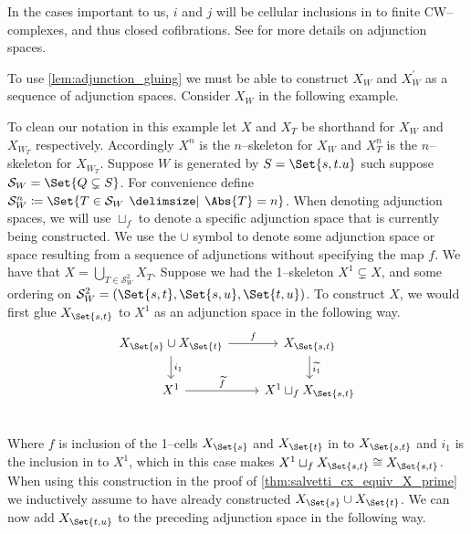 \documentclass[class=article, crop=false]{standalone}
\begin{document}
In the cases important to us, $i$ and $j$ will be cellular inclusions in to finite CW--complexes, and thus closed cofibrations. See \cite{brown_topology_2006} for more details on adjunction spaces.

To use \cref{lem:adjunction_gluing} we must be able to construct $X_W$ and $X_W^\prime$ as a sequence of adjunction spaces. Consider $X_W$ in the following example.

\begin{example}
    \label{eg:inductive_construction}
    To clean our notation in this example let $X$ and $X_T$ be shorthand for $X_W$ and $X_{W_T}$ respectively. Accordingly $X^n$ is the $n$--skeleton for $X_W$ and $X_T^n$ is the $n$--skeleton for $X_{W_T}$.
    Suppose $W$ is generated by $S = \Set{s,t.u}$ such suppose $\mathcal{S}_W  = \Set{Q \subsetneq S}$. For convenience define $\mathcal{S}_W^n \coloneq \Set{T \in \mathcal{S}_W \given \Abs{T} = n }$. When denoting adjunction spaces, we will use $\sqcup_f$ to denote a specific adjunction space that is currently being constructed. We use the $\cup$ symbol to denote some adjunction space or space resulting from a sequence of adjunctions without specifying the map $f$. We have that $X = \bigcup_{T \in \mathcal{S}_W^2} X_T$. Suppose we had the 1--skeleton $X^1 \subsetneq X$, and some ordering on $\mathcal{S}_W^2 = (\Set{s,t}, \Set{s,u}, \Set{t,u})$. To construct $X$, we would first glue $X_{\Set{s,t}}$ to $X^1$ as an adjunction space in the following way.
    \begin{equation}
        \begin{tikzcd}
                X_{{\Set{s}}} \cup X_{{\Set{t}}} \ar[r, "f" ] \ar[d, "i_1"]   &    X_{{\Set{s,t}}} \ar[d, "\widetilde{i_1}"]    \\
                X^1 \ar[r, "\widetilde{f}"]                                 &   X^1 \sqcup_f X_{{\Set{s,t}}}            \\
        \end{tikzcd}
        \label{eqn:inductive_gluing_step_1}
    \end{equation}
    Where $f$ is inclusion of the 1--cells $X_{{\Set{s}}}$ and $X_{{\Set{t}}}$ in to $X_{\Set{s,t}}$ and $i_1$ is the inclusion in to $X^1$, which in this case makes $X^1 \sqcup_f X_{{\Set{s,t}}} \cong X_{{\Set{s,t}}}$. When using this construction in the proof of \cref{thm:salvetti_cx_equiv_X_prime} we inductively assume to have already constructed $ X_{{\Set{s}}} \cup X_{{\Set{t}}}$.
    We can now add $X_{\Set{t,u}}$ to the preceding adjunction space in the following way.

\end{example}
\end{document}
